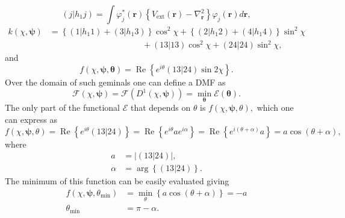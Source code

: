 \documentclass[aps,preprint]{revtex4}%
\begin{document}
\begin{equation}
\left(  j\left\vert h_{1}j\right.  \right)  =\int\varphi_{j}^{\ast}\left(
\boldsymbol{r}\right)  \left\{  V_{\text{ext}}\left(  \boldsymbol{r}\right)
-\nabla_{\boldsymbol{r}}^{2}\right\}  \varphi_{j}\left(  \boldsymbol{r}%
\right)  d\boldsymbol{r,}%
\end{equation}%
\begin{align}
k\left(  \chi,\boldsymbol{\psi}\right)   &  =\left\{  \left(  1\left\vert
h_{1}1\right.  \right)  +\left(  3\left\vert h_{1}3\right.  \right)  \right\}
\cos^{2}\chi+\left\{  \left(  2\left\vert h_{1}2\right.  \right)  +\left(
4\left\vert h_{1}4\right.  \right)  \right\}  \sin^{2}\chi\nonumber\\
&  \qquad\qquad\qquad\qquad\qquad\quad+\left(  \left.  13\right\vert
13\right)  \cos^{2}\chi+\left(  \left.  24\right\vert 24\right)  \sin^{2}\chi,
\end{align}
and
\begin{equation}
f\left(  \chi,\boldsymbol{\psi,\theta}\right)  =\operatorname{Re}\left\{
e^{i\theta}\left(  \left.  13\right\vert 24\right)  \sin2\chi\right\}  .
\end{equation}
Over the domain of such geminals one can define a DMF as
\begin{equation}
\mathcal{F}\left(  \chi,\boldsymbol{\psi}\right)  =\mathcal{F}\left(
D^{1}\left(  \chi,\boldsymbol{\psi}\right)  \right)  =\min_{\boldsymbol{\theta
}}\mathcal{E}\left(  \boldsymbol{\theta}\right)  .
\end{equation}
The only part of the functional $\mathcal{E}$ that depends on $\theta$ is
$f\left(  \chi,\boldsymbol{\psi,}\theta\right)  ,$ which one can express as
\begin{equation}
f\left(  \chi,\boldsymbol{\psi,}\theta\right)  =\operatorname{Re}\left\{
e^{i\theta}\left(  \left.  13\right\vert 24\right)  \right\}
=\operatorname{Re}\left\{  e^{i\theta}ae^{i\alpha}\right\}  =\operatorname{Re}%
\left\{  e^{i\left(  \theta+\alpha\right)  }a\right\}  =a\cos\left(
\theta+\alpha\right)  ,
\end{equation}
where
\begin{align}
a &  =\left\vert \left(  \left.  13\right\vert 24\right)  \right\vert ,\\
\alpha &  =\arg\left\{  \left(  \left.  13\right\vert 24\right)  \right\}  .
\end{align}
The minimum of this function can be easily evaluated giving
\begin{align}
f\left(  \chi,\boldsymbol{\psi,}\theta_{\min}\right)   &  =\min_{\theta
}\left\{  a\cos\left(  \theta+\alpha\right)  \right\}  =-a\\
\theta_{\min} &  =\pi-\alpha.
\end{align}
\end{document}
